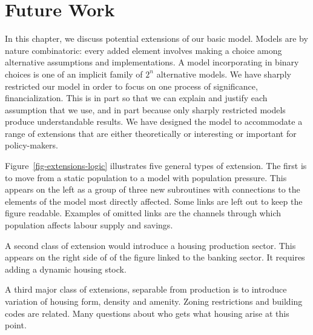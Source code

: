 \chapter[Future Work]{Future Work}
\label{appendix-future-work}

In  this chapter, we discuss potential extensions of our basic model.  Models are by nature combinatoric: every added element involves making a choice among alternative assumptions and implementations. A model incorporating in binary choices is one of an implicit family of $2^n$ alternative models. We have sharply restricted our model  in order to focus on one process of significance, financialization.  This is in part so that we can explain and justify each assumption that we use, and in part because only sharply restricted models produce understandable results. 
We have designed the model to  accommodate a range of extensions that are either theoretically or interesting or important for policy-makers. 

Figure~\ref{fig-extensions-logic} illustrates  five general types of extension. The first is to move from a static population to a model with population pressure. This appears on the left as a group of three new subroutines with connections to the elements of the model most directly affected. Some links are left out to keep the figure readable. Examples of omitted links  are the channels through which  population affects labour supply and savings.  

A second class of extension would introduce a housing production sector. This appears on the right side of of the figure linked to the banking sector. It requires adding a dynamic housing  stock. 

A third major class of extensions, separable from production is to introduce variation of housing form,  density and amenity. Zoning restrictions and building codes are related. Many questions about who gets what housing arise at this point. 

